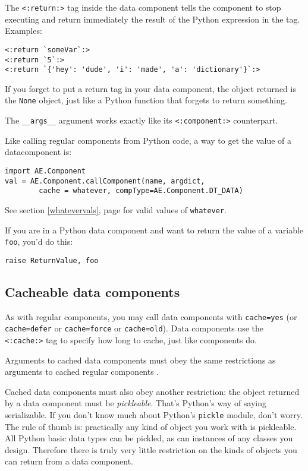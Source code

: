 \documentclass{manual}
\begin{document}
The \texttt{<:return:>} tag inside the data component tells
the component to stop executing and return immediately
the result of the Python expression in the tag. Examples:

\begin{verbatim}<:return `someVar`:>
<:return `5`:>
<:return `{'hey': 'dude', 'i': 'made', 'a': 'dictionary'}`:>
\end{verbatim}

If you forget to put a return tag in your data component, 
the object returned is the \texttt{None} object, just like a Python 
function that forgets to return something.

The \texttt{__args__} argument works exactly like its
\texttt{<:component:>} counterpart.

Like calling regular components from Python code, a way to get the
value of a datacomponent is:
\begin{verbatim}
import AE.Component
val = AE.Component.callComponent(name, argdict, 	
        cache = whatever, compType=AE.Component.DT_DATA)
\end{verbatim}
See section \ref{whatevervals}, page \pageref{whatevervals} for valid
values of \texttt{whatever}.

If you are in a Python data component and want to return the value of
a variable \texttt{foo}, you'd do this:
\begin{verbatim}
raise ReturnValue, foo
\end{verbatim}

\subsection{Cacheable data components}
\label{tagdatacompcaching}

As with regular components, you may call data components with
\texttt{cache=yes} (or \texttt{cache=defer} or \texttt{cache=force} or
\texttt{cache=old}). Data components use the \texttt{<:cache:>}
 tag to specify how long to cache, just like
components do.

Arguments to cached data components must obey the same 
restrictions as arguments 
to cached regular components .

Cached data components must also obey another restriction: 
the object returned by a data component must be \emph{pickleable}. 
That's Python's way of saying serializable. If you don't 
know much about Python's \texttt{pickle} module, don't worry. 
The rule of thumb is: practically any kind of object you work 
with is pickleable. All Python basic data types can be pickled, 
as can instances of any classes you design. Therefore there is 
truly very little restriction on the kinds of objects you can 
return from a data component.
\end{document}
